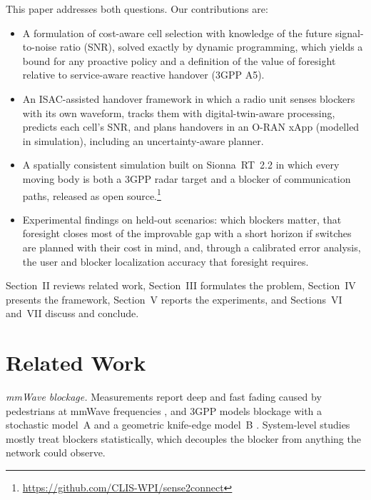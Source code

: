 \documentclass[conference]{IEEEtran}
\begin{document}
This paper addresses both questions. Our contributions are:
\begin{itemize}
\item A formulation of cost-aware cell selection with knowledge of the
future signal-to-noise ratio (SNR), solved exactly by dynamic
programming, which yields a bound for any proactive policy and a
definition of the value of foresight relative to service-aware reactive
handover (3GPP A5).
\item An ISAC-assisted handover framework in which a radio unit senses
blockers with its own waveform, tracks them with digital-twin-aware
processing, predicts each cell's SNR, and plans handovers in an O-RAN
xApp (modelled in simulation), including an uncertainty-aware planner.
\item A spatially consistent simulation built on Sionna~RT~2.2
\cite{hoydis2023sionnart,sionna} in which every moving body is both a 3GPP
radar target and a blocker of communication paths, released as open
source.\footnote{\url{https://github.com/CLIS-WPI/sense2connect}}
\item Experimental findings on held-out scenarios: which blockers
matter, that foresight closes most of the improvable gap with a short
horizon if switches are planned with their cost in mind, and, through a
calibrated error analysis, the user and blocker localization accuracy
that foresight requires.
\end{itemize}
Section~II reviews related work, Section~III formulates the problem,
Section~IV presents the framework, Section~V reports the experiments,
and Sections~VI and~VII discuss and conclude.

\section{Related Work}
\textit{mmWave blockage.} Measurements report deep and fast fading
caused by pedestrians at mmWave frequencies \cite{maccartney2017blockage},
and 3GPP models blockage with a stochastic model~A and a geometric
knife-edge model~B \cite{3gpp38901}. System-level studies mostly treat
blockers statistically, which decouples the blocker from anything the
network could observe.
\end{document}
